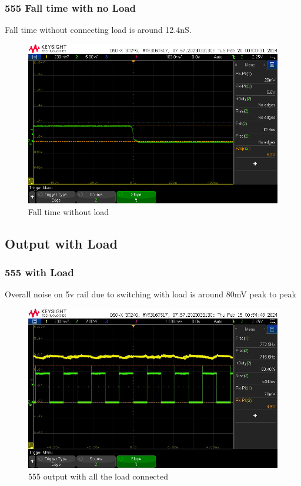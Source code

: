 \documentclass[a4paper,11pt]{article}%
\begin{document}
\subsubsection{555 Fall time with no Load}
Fall time without connecting load is around 12.4nS.
\begin{figure}[H]
	\centering
	\includegraphics[scale=0.5]{figures/fall_without_load.png}
	\caption{Fall time without load}
\end{figure}



\subsection{Output with Load}



\subsubsection{555 with Load}
Overall noise on 5v rail due to switching with load is around 80mV peak to peak
\begin{figure}[H]
	\centering
	\includegraphics[scale=0.6]{figures/power_noise_overall.jpg}
	\caption{555 output with all the load connected}
\end{figure}
\end{document}
